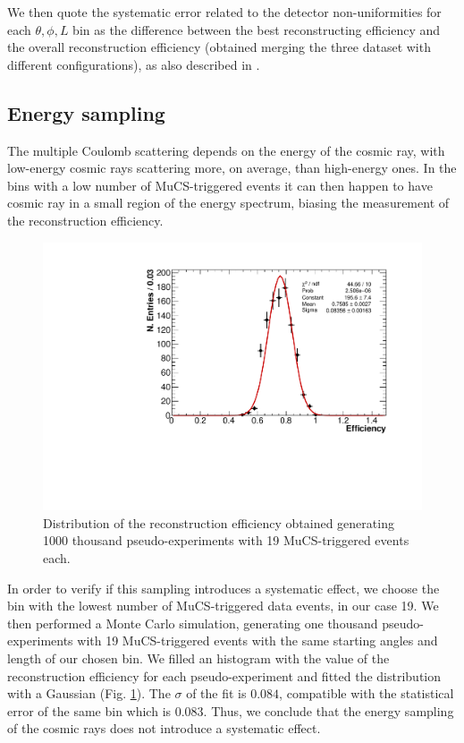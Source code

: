 \documentclass[a4paper]{scrartcl}
\begin{document}
We then quote the systematic error related to the detector non-uniformities for each $\theta,\phi,L$ bin as the difference between the best reconstructing efficiency and the overall reconstruction efficiency (obtained merging the three dataset with different configurations), as also described in \cite{besiii}.

\subsection{Energy sampling}
The multiple Coulomb scattering depends on the energy of the cosmic ray, with low-energy cosmic rays scattering more, on average, than high-energy ones. In the bins with a low number of MuCS-triggered events it can then happen to have cosmic ray in a small region of the energy spectrum, biasing the measurement of the reconstruction efficiency.

\begin{figure}[htbp]
  \begin{center}
    \includegraphics[width=0.7\linewidth]{figures/sampling.pdf}
    \caption{Distribution of the reconstruction efficiency obtained generating 1000 thousand pseudo-experiments with 19 MuCS-triggered events each.} \label{fig:sampling}
  \end{center}
\end{figure}

In order to verify if this sampling introduces a systematic effect, we choose the bin with the lowest number of MuCS-triggered data events, in our case 19. We then performed a Monte Carlo simulation, generating one thousand pseudo-experiments with 19 MuCS-triggered events with the same starting angles and length of our chosen bin. We filled an histogram with the value of the reconstruction efficiency for each pseudo-experiment and fitted the distribution with a Gaussian (Fig. \ref{fig:sampling}). The $\sigma$ of the fit is $0.084$, compatible with the statistical error of the same bin which is $0.083$. Thus, we conclude that the energy sampling of the cosmic rays does not introduce a systematic effect.
\end{document}
